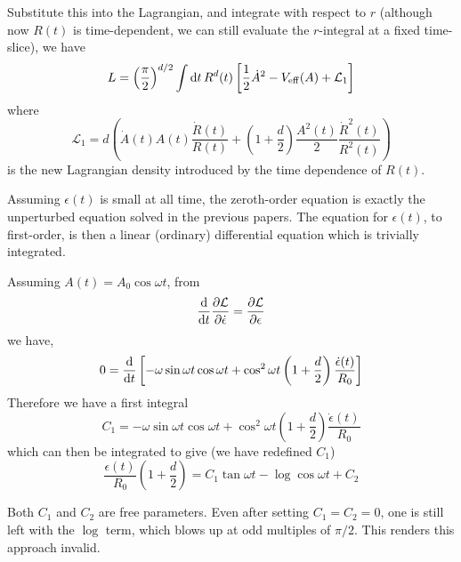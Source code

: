 \documentclass{report}
\begin{document}
Substitute this into the Lagrangian, and integrate with respect to $r$ (although now $R(t)$ is time-dependent, we can still evaluate the $r$-integral at a fixed time-slice), we have
\begin{equation}
 L = \left(\frac{\pi}{2}\right)^{d/2}\int {\rm d}t\, R^d(t) \left[ \frac{1}{2}\dot{A}^2 - V_{\rm eff} (A) +
    \mathcal{L}_1\right]
\end{equation}
where
\begin{equation}
  \mathcal{L}_1 = d\left( \dot{A}(t)A(t)\frac{\dot{R}(t)}{R(t)} +\left(1+\frac{d}{2}\right)\frac{A^2(t)}{2}\frac{\dot{R}^2(t)}{R^2(t)}\right)
\end{equation}
is the new Lagrangian density introduced by the time dependence of $R(t)$.

Assuming $\epsilon(t)$ is small at all time, the zeroth-order equation is exactly the unperturbed equation solved in the previous papers. The equation for $\epsilon(t)$, to first-order, is then a linear (ordinary) differential equation which is trivially integrated.

Assuming $A(t)=A_0\cos\omega t$, from
\begin{equation}
  \frac{\rm d}{{\rm d}t}\frac{\partial \mathcal{L}}{\partial \dot{\epsilon}} =
  \frac{\partial\mathcal{L}}{\partial \epsilon}
\end{equation}
we have,
\begin{equation}
  0 = \frac{\rm d}{{\rm d}t}\left[-\omega\sin\omega t\cos\omega t + \cos^2\omega t\left(1+\frac{d}{2}
    \right)\frac{\dot{\epsilon}(t)}{R_0}\right]
\end{equation}
Therefore we have a first integral
\begin{equation}
  C_1 = -\omega\sin\omega t\cos\omega t + \cos^2\omega t\left(1+\frac{d}{2}
  \right)\frac{\dot{\epsilon}(t)}{R_0}
\end{equation}
which can then be integrated to give (we have redefined $C_1$)
\begin{equation}\label{sol}
  \frac{\epsilon(t)}{R_0}\left(1+\frac{d}{2}\right)
  = C_1\tan\omega t  - \log\cos\omega t + C_2
\end{equation}

Both $C_1$ and $C_2$ are free parameters. Even after setting $C_1=C_2=0$, one is still left with the $\log$ term, which blows up at odd multiples of $\pi/2$. This renders this approach invalid.
\end{document}

